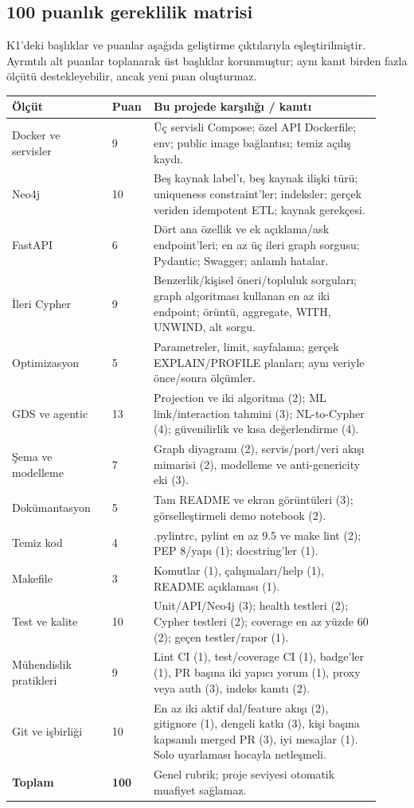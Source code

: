 \documentclass[11pt,a4paper]{article}
\begin{document}
\subsection{100 puanlık gereklilik matrisi}
K1'deki başlıklar ve puanlar aşağıda geliştirme çıktılarıyla eşleştirilmiştir. Ayrıntılı alt puanlar toplanarak üst başlıklar korunmuştur; aynı kanıt birden fazla ölçütü destekleyebilir, ancak yeni puan oluşturmaz.
\small
\begin{longtable}{@{}P{0.26\linewidth}P{0.07\linewidth}P{0.59\linewidth}@{}}
\toprule\textbf{Ölçüt} & \textbf{Puan} & \textbf{Bu projede karşılığı / kanıtı}\\\midrule\endhead
Docker ve servisler & 9 & Üç servisli Compose; özel API Dockerfile; env; public image bağlantısı; temiz açılış kaydı.\\
Neo4j & 10 & Beş kaynak label'ı, beş kaynak ilişki türü; uniqueness constraint'ler; indeksler; gerçek veriden idempotent ETL; kaynak gerekçesi.\\
FastAPI & 6 & Dört ana özellik ve ek açıklama/ask endpoint'leri; en az üç ileri graph sorgusu; Pydantic; Swagger; anlamlı hatalar.\\
İleri Cypher & 9 & Benzerlik/kişisel öneri/topluluk sorguları; graph algoritması kullanan en az iki endpoint; örüntü, aggregate, WITH, UNWIND, alt sorgu.\\
Optimizasyon & 5 & Parametreler, limit, sayfalama; gerçek EXPLAIN/PROFILE planları; aynı veriyle önce/sonra ölçümler.\\
GDS ve agentic & 13 & Projection ve iki algoritma (2); ML link/interaction tahmini (3); NL-to-Cypher (4); güvenilirlik ve kısa değerlendirme (4).\\
Şema ve modelleme & 7 & Graph diyagramı (2), servis/port/veri akışı mimarisi (2), modelleme ve anti-genericity eki (3).\\
Dokümantasyon & 5 & Tam README ve ekran görüntüleri (3); görselleştirmeli demo notebook (2).\\
Temiz kod & 4 & .pylintrc, pylint en az 9.5 ve make lint (2); PEP 8/yapı (1); docstring'ler (1).\\
Makefile & 3 & Komutlar (1), çalışmaları/help (1), README açıklaması (1).\\
Test ve kalite & 10 & Unit/API/Neo4j (3); health testleri (2); Cypher testleri (2); coverage en az yüzde 60 (2); geçen testler/rapor (1).\\
Mühendislik pratikleri & 9 & Lint CI (1), test/coverage CI (1), badge'ler (1), PR başına iki yapıcı yorum (1), proxy veya auth (3), indeks kanıtı (2).\\
Git ve işbirliği & 10 & En az iki aktif dal/feature akışı (2), gitignore (1), dengeli katkı (3), kişi başına kapsamlı merged PR (3), iyi mesajlar (1). Solo uyarlaması hocayla netleşmeli.\\\midrule
\textbf{Toplam} & \textbf{100} & Genel rubrik; proje seviyesi otomatik muafiyet sağlamaz.\\\bottomrule
\end{longtable}\normalsize
\end{document}
